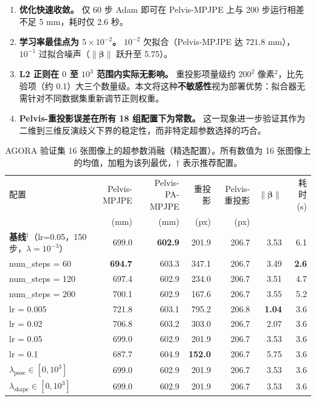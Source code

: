 \documentclass[a4paper,11pt]{article}
\begin{document}
\begin{enumerate}
  \item \textbf{优化快速收敛。} 仅 60 步 Adam 即可在 Pelvis-MPJPE 上与 200 步运行相差不足 5 mm，耗时仅 2.6 秒。
  \item \textbf{学习率最佳点为 $5\!\times\!10^{-2}$。} $10^{-2}$ 欠拟合（Pelvis-MPJPE 达 $721.8$ mm），$10^{-1}$ 过拟合噪声（$\|\boldsymbol{\beta}\|$ 跃升至 5.75）。
  \item \textbf{L2 正则在 $0$ 至 $10^{3}$ 范围内实际无影响。} 重投影项量级约 $200^{2}$ 像素$^2$，比先验项（约 0.1）大三个数量级。本文将这种\textbf{不敏感性}视为部署优势：拟合器无需针对不同数据集重新调节正则权重。
  \item \textbf{Pelvis-重投影误差在所有 18 组配置下为常数。} 这一现象进一步验证其作为二维到三维反演歧义下界的稳定性，而非特定超参数选择的巧合。
\end{enumerate}

\begin{table}[htbp]
\centering
\caption{AGORA 验证集 16 张图像上的超参数消融（精选配置）。所有数值为 16 张图像上的均值，加粗为该列最优，$\dagger$ 表示推荐配置。}
\label{tab:abl}
\small
\begin{tabular}{l r r r r r r}
\toprule
配置 & Pelvis-MPJPE & Pelvis-PA-MPJPE & 重投影 & Pelvis-重投影 & $\|\boldsymbol{\beta}\|$ & 耗时 (s)\\
 & (mm) & (mm) & (px) & (px) & & \\
\midrule
\textbf{基线}$^\dagger$（lr=0.05，150 步，$\lambda\!=\!10^{-3}$） & 699.0 & \textbf{602.9} & 201.9 & 206.7 & 3.53 & 6.1 \\
num\_steps = 60  & \textbf{694.7} & 603.3 & 347.1 & 206.7 & 3.49 & \textbf{2.6} \\
num\_steps = 120 & 697.4 & 602.9 & 234.0 & 206.7 & 3.51 & 4.7 \\
num\_steps = 200 & 700.1 & 602.9 & 167.6 & 206.7 & 3.55 & 5.2 \\
lr = 0.005       & 721.8 & 603.1 & 795.2 & 206.8 & \textbf{1.04} & 3.6 \\
lr = 0.02        & 706.8 & 603.2 & 303.0 & 206.7 & 2.07 & 3.6 \\
lr = 0.05        & 699.0 & 602.9 & 201.9 & 206.7 & 3.53 & 3.6 \\
lr = 0.1         & 687.7 & 604.9 & \textbf{152.0} & 206.7 & 5.75 & 3.6 \\
$\lambda_{\text{pose}} \in [0,10^3]$ & 699.0 & 602.9 & 201.9 & 206.7 & 3.53 & 3.6 \\
$\lambda_{\text{shape}} \in [0,10^3]$ & 699.0 & 602.9 & 201.9 & 206.7 & 3.53 & 3.6 \\
\bottomrule
\end{tabular}
\end{table}
\end{document}
